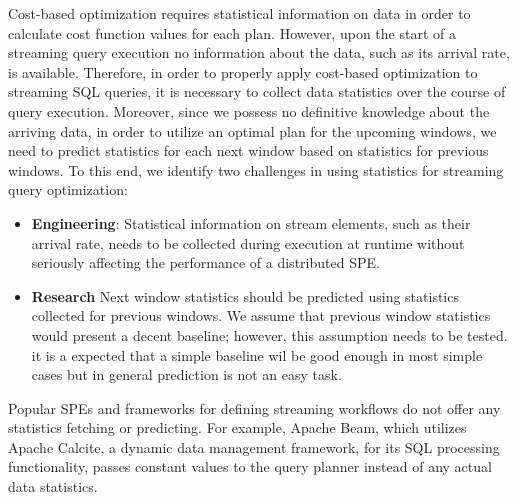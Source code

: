 Cost-based optimization requires statistical information on data in order to calculate cost function values for each plan. However, upon the start of a streaming query execution no information about the data, such as its arrival rate, is available. 
Therefore, in order to properly apply cost-based optimization to streaming SQL queries, it is necessary to collect data statistics over the course of query execution. 
Moreover, since we possess no definitive knowledge about the arriving data, in order to utilize an optimal plan for the upcoming windows, we need to predict statistics for each next window based on statistics for previous windows. To this end, we identify two challenges in using statistics for streaming query optimization:

\begin{itemize}
    \item \textbf{Engineering}:
    Statistical information on stream elements, such as their arrival rate, needs to be collected during execution at runtime without seriously affecting the performance of a distributed SPE. %
    \item \textbf{Research}
    Next window statistics should be predicted using statistics collected for previous windows. We assume that previous window statistics would present a decent baseline; however, this assumption needs to be tested. it is a expected that a simple baseline wil be good enough in most simple cases but in general prediction is not an easy task.
\end{itemize}

Popular SPEs and frameworks for defining streaming workflows do not offer any statistics fetching or predicting. For example, Apache Beam, which utilizes Apache Calcite, a dynamic data management framework, for its SQL processing functionality, passes constant values to the query planner instead of any actual data statistics.

